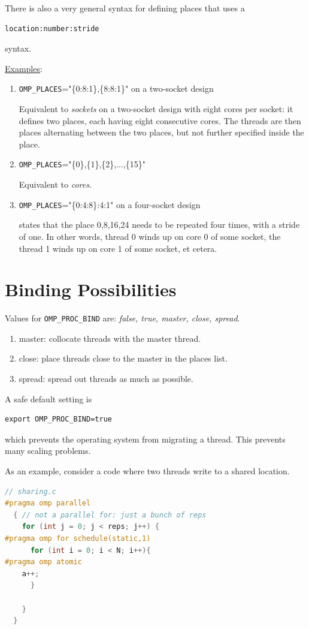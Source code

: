 \documentclass[11pt]{book} %
\begin{document}
There is also a very general syntax for defining places that uses a
\begin{verbatim}
location:number:stride
\end{verbatim}
syntax.

\underline{Examples}:
\begin{enumerate}
\item \verb|OMP_PLACES|="\{0:8:1\},\{8:8:1\}" on a two-socket design

Equivalent to \emph{sockets} on a two-socket design with eight cores per socket: it defines two places, each having eight consecutive cores. The threads are then places alternating between the two places, but not further specified inside the place.
\item \verb|OMP_PLACES|="\{0\},\{1\},\{2\},...,\{15\}"

Equivalent to \emph{cores}.
\item \verb|OMP_PLACES|="\{0:4:8\}:4:1" on a four-socket design

states that the place 0,8,16,24 needs to be repeated four times, with a stride of one. In other words, thread 0 winds up on core 0 of some socket, the thread 1 winds up on core 1 of some socket, et cetera.
\end{enumerate}


\section{Binding Possibilities}

Values for \verb|OMP_PROC_BIND| are: \emph{false, true, master, close, spread}.
\begin{enumerate}
\item master: collocate threads with the master thread.
\item close: place threads close to the master in the places list.
\item spread: spread out threads as much as possible.
\end{enumerate}

A safe default setting is
\begin{verbatim}
export OMP_PROC_BIND=true
\end{verbatim}
which prevents the operating system from migrating a thread. This prevents many scaling problems.

As an example, consider a code where two threads write to a shared location.
\begin{lstlisting}[language=C, caption=sharing]
// sharing.c
#pragma omp parallel
  { // not a parallel for: just a bunch of reps
    for (int j = 0; j < reps; j++) {
#pragma omp for schedule(static,1)
      for (int i = 0; i < N; i++){
#pragma omp atomic
	a++;  
      }
      
    }
  }
\end{lstlisting}
\end{document}
